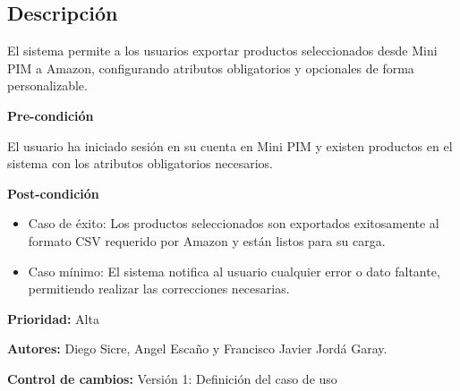 
\subsection*{Descripción}
El sistema permite a los usuarios exportar productos seleccionados desde Mini PIM a Amazon, configurando atributos obligatorios y opcionales de forma personalizable.

\vspace{0.15cm}

\textbf{Pre-condición}\par
El usuario ha iniciado sesión en su cuenta en Mini PIM y existen productos en el sistema con los atributos obligatorios necesarios.

\vspace{0.15cm}

\textbf{Post-condición}
\begin{itemize}
    \item Caso de éxito: Los productos seleccionados son exportados exitosamente al formato CSV requerido por Amazon y están listos para su carga.
    \item Caso mínimo: El sistema notifica al usuario cualquier error o dato faltante, permitiendo realizar las correcciones necesarias.
\end{itemize}

\textbf{Prioridad:}
Alta

\vspace{0.15cm}

\textbf{Autores:}
Diego Sicre, Angel Escaño y Francisco Javier Jordá Garay.

\vspace{0.15cm}

\textbf{Control de cambios: } Versión 1: Definición del caso de uso

